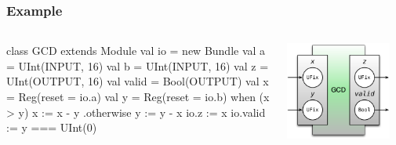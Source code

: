 \documentclass[xcolor=pdflatex,dvipsnames,table]{beamer}
\begin{document}
\begin{frame}[fragile]
\frametitle{Example}
\begin{columns}


\begin{footnotesize}
\begin{scala}
class GCD extends Module {
  val io = new Bundle {
    val a     = UInt(INPUT, 16)
    val b     = UInt(INPUT, 16)
    val z     = UInt(OUTPUT, 16)
    val valid = Bool(OUTPUT) }
  val x = Reg(reset = io.a)
  val y = Reg(reset = io.b)
  when (x > y) {
    x := x - y
  } .otherwise {
    y := y - x
  }
  io.z     := x
  io.valid := y === UInt(0)
}
\end{scala}
\end{footnotesize}


\begin{center}
\includegraphics[width=0.9\textwidth]{figs/gcd.pdf} 
\end{center}

\end{columns}
\end{frame}

\end{document}
